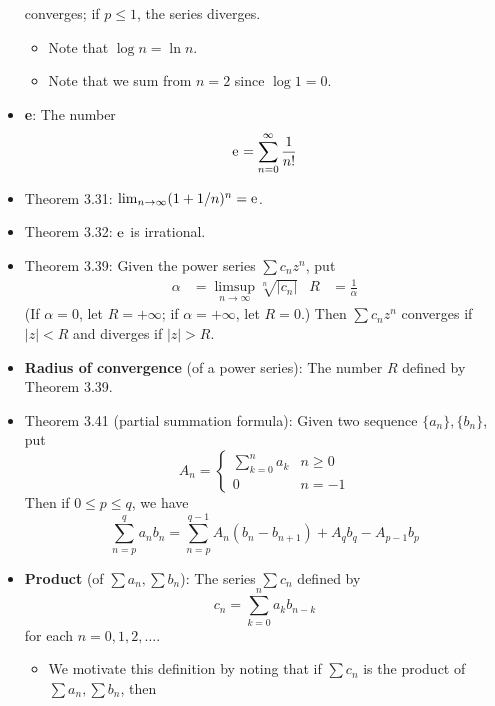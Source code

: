 \documentclass[../../notes.tex]{subfiles}
\begin{document}
\begin{itemize}
\begin{equation*}
    \end{equation*}
    converges; if $p\leq 1$, the series diverges.
    \begin{itemize}
        \item Note that $\log n=\ln n$.
        \item Note that we sum from $n=2$ since $\log 1=0$.
    \end{itemize}
    \item \textbf{e}: The number
    \begin{equation*}
        \text{e}^{} = \sum_{n=0}^\infty\frac{1}{n!}
    \end{equation*}
    \item Theorem 3.31: $\lim_{n\to\infty}(1+1/n)^n=\text{e}^{}$.
    \item Theorem 3.32: $\text{e}^{}$ is irrational.
    \item Theorem 3.39: Given the power series $\sum c_nz^n$, put
    \begin{align*}
        \alpha &= \limsup_{n\to\infty}\sqrt[n]{|c_n|}&
        R &= \frac{1}{\alpha}
    \end{align*}
    (If $\alpha=0$, let $R=+\infty$; if $\alpha=+\infty$, let $R=0$.) Then $\sum c_nz^n$ converges if $|z|<R$ and diverges if $|z|>R$.
    \item \textbf{Radius of convergence} (of a power series): The number $R$ defined by Theorem 3.39.
    \item Theorem 3.41 (partial summation formula): Given two sequence $\{a_n\},\{b_n\}$, put
    \begin{equation*}
        A_n =
        \begin{cases}
            \sum_{k=0}^na_k & n\geq 0\\
            0 & n=-1
        \end{cases}
    \end{equation*}
    Then if $0\leq p\leq q$, we have
    \begin{equation*}
        \sum_{n=p}^qa_nb_n = \sum_{n=p}^{q-1}A_n(b_n-b_{n+1})+A_qb_q-A_{p-1}b_p
    \end{equation*}
    \item \textbf{Product} (of $\sum a_n,\sum b_n$): The series $\sum c_n$ defined by
    \begin{equation*}
        c_n = \sum_{k=0}^na_kb_{n-k}
    \end{equation*}
    for each $n=0,1,2,\dots$.
    \begin{itemize}
        \item We motivate this definition by noting that if $\sum c_n$ is the product of $\sum a_n,\sum b_n$, then

\end{itemize}
\end{itemize}
\end{document}
